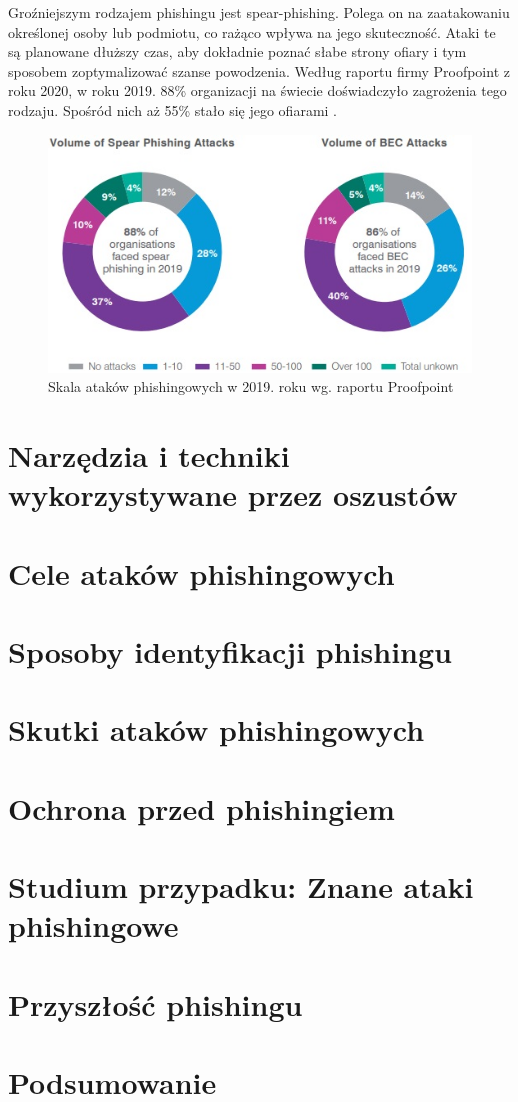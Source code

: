 \documentclass[]{article}
\begin{document}
Groźniejszym rodzajem phishingu jest spear-phishing. Polega on na zaatakowaniu określonej osoby lub podmiotu, co rażąco wpływa na jego skuteczność. Ataki te są planowane dłuższy czas, aby dokładnie poznać słabe strony ofiary i tym sposobem zoptymalizować szanse powodzenia. Według raportu firmy Proofpoint z roku 2020, w roku 2019. 88\% organizacji na świecie doświadczyło zagrożenia tego rodzaju. Spośród nich aż 55\% stało się jego ofiarami \cite{proofpoint2020}.

\begin{figure}
	\centering
	\includegraphics[width=0.8\linewidth]{Pictures/proofpoint_phishing2019.jpg}
	\caption{Skala ataków phishingowych w 2019. roku wg. raportu Proofpoint}
	\label{fig:sample}
\end{figure}

\newpage
\section{Narzędzia i techniki wykorzystywane przez oszustów}

\newpage
\section{Cele ataków phishingowych}

\newpage
\section{Sposoby identyfikacji phishingu}

\newpage
\section{Skutki ataków phishingowych}

\newpage
\section{Ochrona przed phishingiem}

\newpage
\section{Studium przypadku: Znane ataki phishingowe}

\newpage
\section{Przyszłość phishingu}

\newpage
\section{Podsumowanie}

\newpage


\end{document}
